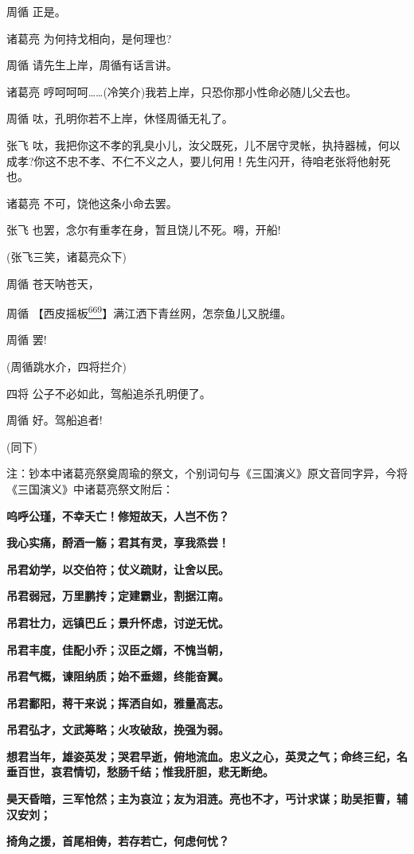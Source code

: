 周循 正是。

诸葛亮 为何持戈相向，是何理也?

周循 请先生上岸，周循有话言讲。

诸葛亮
哼呵呵呵\ldots{}\ldots{}(冷笑介)我若上岸，只恐你那小性命必随儿父去也。

周循 呔，孔明你若不上岸，休怪周循无礼了。

张飞
呔，我把你这不孝的乳臭小儿，汝父既死，儿不居守灵帐，执持器械，何以成孝?你这不忠不孝、不仁不义之人，要儿何用！先生闪开，待咱老张将他射死也。

诸葛亮 不可，饶他这条小命去罢。

张飞 也罢，念尔有重孝在身，暂且饶儿不死。嘚，开船!

(张飞三笑，诸葛亮众下)

周循 苍天呐苍天，

周循
【西皮摇板\protect\hyperlink{fn669}{\textsuperscript{669}}】满江洒下青丝网，怎奈鱼儿又脱缰。

周循 罢!

(周循跳水介，四将拦介)

四将 公子不必如此，驾船追杀孔明便了。

周循 好。驾船追者!

(同下)

注：钞本中诸葛亮祭奠周瑜的祭文，个别词句与《三国演义》原文音同字异，今将《三国演义》中诸葛亮祭文附后：

\textbf{呜呼公瑾，不幸夭亡！修短故天，人岂不伤？}

\textbf{我心实痛，酹酒一觞；君其有灵，享我烝尝！}

\textbf{吊君幼学，以交伯符；仗义疏财，让舍以民。}

\textbf{吊君弱冠，万里鹏抟；定建霸业，割据江南。}

\textbf{吊君壮力，远镇巴丘；景升怀虑，讨逆无忧。}

\textbf{吊君丰度，佳配小乔；汉臣之婿，不愧当朝，}

\textbf{吊君气概，谏阻纳质；始不垂翅，终能奋翼。}

\textbf{吊君鄱阳，蒋干来说；挥洒自如，雅量高志。}

\textbf{吊君弘才，文武筹略；火攻破敌，挽强为弱。}

\textbf{想君当年，雄姿英发；哭君早逝，俯地流血。忠义之心，英灵之气；命终三纪，名垂百世，哀君情切，愁肠千结；惟我肝胆，悲无断绝。}

\textbf{昊天昏暗，三军怆然；主为哀泣；友为泪涟。亮也不才，丐计求谋；助吴拒曹，辅汉安刘；}

\textbf{掎角之援，首尾相俦，若存若亡，何虑何忧？}

